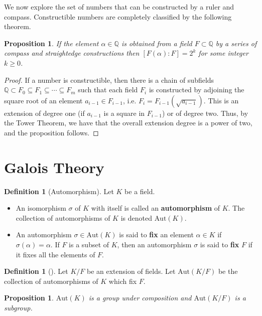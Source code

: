 \documentclass[10pt, oneside, reqno]{amsart}
\theoremstyle{plain}%
\newtheorem{prop}[thm]{Proposition}
\theoremstyle{definition}
\newtheorem{defn}[thm]{Definition}
\theoremstyle{remark}
\newcommand{\Q}{\mathbb{Q}}
\newcommand{\R}{\mathbb{Q}}
\newcommand{\aut}[1]{\text{Aut}{(#1)}}
\newcommand{\xdeg}[2]{[#1 : #2]}
\begin{document}
We now explore the set of numbers that can be constructed by a ruler and compass.  Constructible numbers are completely classified by the following theorem.

\begin{prop}
	If the element $\alpha \in \R$ is obtained from a field $F \subset \R$ by a series of compass and straightedge constructions then $\xdeg{F(\alpha)}{F} = 2^k$ for some integer $k \geq 0$.
\end{prop}

\begin{proof}
	If a number is constructible, then there is a chain of subfields $\Q \subset F_0 \subseteq F_1 \subseteq \cdots \subseteq F_m$ such that each field $F_i$ is constructed by adjoining the square root of an element $a_{i-1} \in F_{i-1}$, i.e. $F_{i} = F_{i-1}(\sqrt{a_{i-1}})$.  This is an extension of degree one (if $a_{i-1}$ is a square in $F_{i-1}$) or of degree two. Thus, by the Tower Theorem, we have that the overall extension degree is a power of two, and the proposition follows.
\end{proof}




\section{Galois Theory} %
\label{cha:galois_theory}

\begin{defn}[Automorphism]
	Let $K$ be a field.  
	\begin{itemize}
		\item An isomorphism $\sigma$ of $K$ with itself is called an \textbf{automorphism} of $K$.  The collection of automorphisms of $K$ is denoted $\aut{K}$.  
		\item An automorphism $\sigma \in \aut{K}$ is said to \textbf{fix} an element $\alpha \in K$ if $\sigma(\alpha) = \alpha$.  If $F$ is a subset of $K$, then an automorphism $\sigma$ is said to \textbf{fix} $F$ if it fixes all the elements of $F$. 
	\end{itemize}
\end{defn}

\begin{defn}[]
	Let $K/F$ be an extension of fields.  Let $\aut{K/F}$ be the collection of automorphisms of $K$ which fix $F$.
\end{defn}

\begin{prop}
	$\aut{K}$ is a group under composition and $\aut{K/F}$ is a subgroup.
\end{prop}
\end{document}

